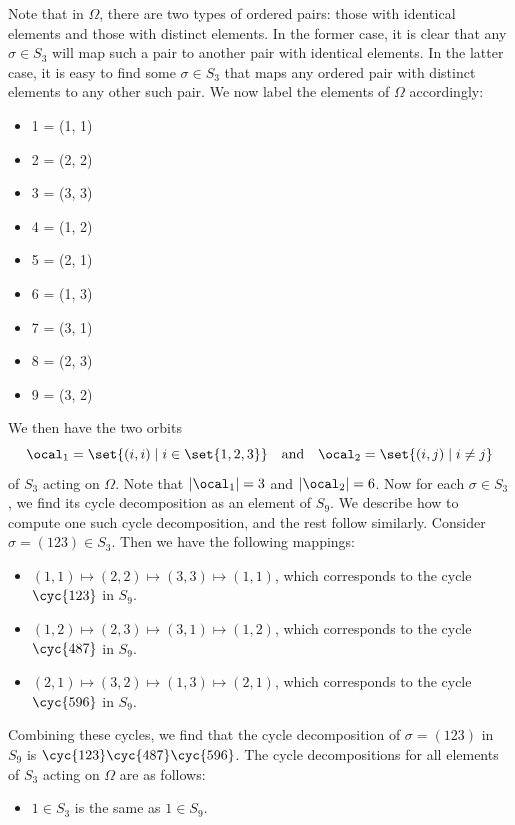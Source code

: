 \begin{sol}
	Note that in $\Omega$, there are two types of ordered pairs: those with identical elements and those with distinct elements.
	In the former case, it is clear that any $\sigma \in S_3$ will map such a pair to another pair with identical elements.
	In the latter case, it is easy to find some $\sigma \in S_3$ that maps any ordered pair with distinct elements to any other such pair.
	We now label the elements of $\Omega$ accordingly:
    \begin{itemize}
        \item 1 = (1, 1)
        \item 2 = (2, 2)
        \item 3 = (3, 3)
        \item 4 = (1, 2)
        \item 5 = (2, 1)
        \item 6 = (1, 3)
        \item 7 = (3, 1)
        \item 8 = (2, 3)
        \item 9 = (3, 2)
    \end{itemize}
	We then have the two orbits 
	\[
		\ocal_1 = \set{(i, i) \mid i \in \set{1, 2, 3}} \quad \text{and} \quad \ocal_2 = \set{(i, j) \mid i \neq j}
	\]
	of $S_3$ acting on $\Omega$.
	Note that $|\ocal_1| = 3$ and $|\ocal_2| = 6$.
	Now for each $\sigma \in S_3$, we find its cycle decomposition as an element of $S_9$.
	We describe how to compute one such cycle decomposition, and the rest follow similarly.
	Consider $\sigma = (1 2 3) \in S_3$.
	Then we have the following mappings:
	\begin{itemize}
		\item $(1, 1) \mapsto (2, 2) \mapsto (3, 3) \mapsto (1, 1)$, which corresponds to the cycle $\cyc{1 2 3}$ in $S_9$.
		\item $(1, 2) \mapsto (2, 3) \mapsto (3, 1) \mapsto (1, 2)$, which corresponds to the cycle $\cyc{4 8 7}$ in $S_9$.
		\item $(2, 1) \mapsto (3, 2) \mapsto (1, 3) \mapsto (2, 1)$, which corresponds to the cycle $\cyc{5 9 6}$ in $S_9$.
	\end{itemize}
	Combining these cycles, we find that the cycle decomposition of $\sigma = (1 2 3)$ in $S_9$ is $\cyc{1 2 3}\cyc{4 8 7}\cyc{5 9 6}$.
	The cycle decompositions for all elements of $S_3$ acting on $\Omega$ are as follows:
    \begin{itemize}
        \item $1 \in S_3$ is the same as $1 \in S_9$.

\end{itemize}
\end{sol}
